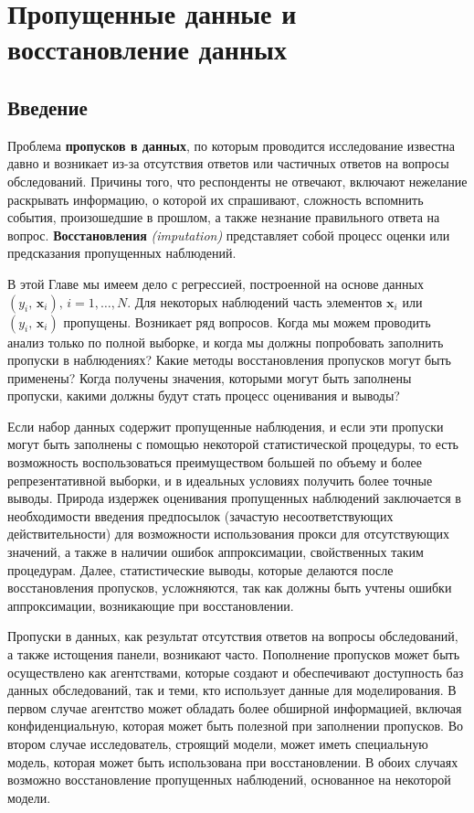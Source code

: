 

\chapter{Пропущенные данные и восстановление данных}
\section{Введение}
Проблема {\bf пропусков в данных}, по которым проводится исследование известна давно и возникает из-за отсутствия ответов или частичных ответов на вопросы обследований. Причины того, что респонденты не отвечают, включают нежелание раскрывать информацию, о которой их спрашивают, сложность вспомнить события, произошедшие в прошлом, а также незнание правильного ответа на вопрос. {\bf Восстановления} \emph{(imputation)} представляет собой процесс оценки или предсказания пропущенных наблюдений.

В этой Главе мы имеем дело с регрессией, построенной на основе  данных $(y_i, \, \mathbf{x}_i), \, i=1,\dots, N$. Для некоторых наблюдений часть элементов $\mathbf{x}_i$ или  $(y_i, \, \mathbf{x}_i)$ пропущены. Возникает ряд вопросов. Когда мы можем проводить анализ только по полной выборке, и когда мы должны попробовать заполнить пропуски в наблюдениях? Какие методы восстановления пропусков могут быть применены? Когда получены значения, которыми могут быть заполнены пропуски, какими должны будут стать процесс оценивания и выводы?

Если набор данных содержит пропущенные наблюдения, и если эти пропуски могут быть заполнены с помощью некоторой статистической процедуры,  то есть возможность воспользоваться преимуществом большей по объему и более репрезентативной выборки, и в идеальных условиях получить более точные выводы. Природа издержек оценивания пропущенных наблюдений заключается в необходимости введения предпосылок (зачастую несоответствующих действительности) для возможности использования прокси для отсутствующих значений, а также в наличии ошибок аппроксимации, свойственных таким процедурам. Далее, статистические выводы, которые делаются после восстановления пропусков, усложняются, так как должны быть учтены ошибки аппроксимации, возникающие при восстановлении. 

Пропуски в данных, как результат отсутствия ответов на вопросы обследований, а также истощения панели, возникают часто. Пополнение пропусков может быть осуществлено как агентствами, которые создают и обеспечивают доступность баз данных обследований, так и теми, кто использует данные для моделирования. В первом случае агентство может обладать более обширной информацией, включая конфиденциальную, которая может быть полезной при заполнении пропусков. Во втором случае исследователь, строящий модели, может иметь специальную  модель, которая может быть использована при восстановлении. В обоих случаях возможно восстановление пропущенных наблюдений, основанное на некоторой модели.

